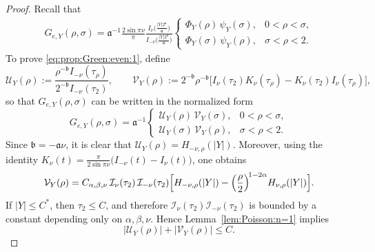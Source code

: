 \documentclass[12pt]{amsart}
\begin{document}
\begin{proof}
Recall that
\begin{align}\label{eq:normal}
G_{e,Y}(\rho,\sigma) = \mathfrak a^{-1} \frac{2\sin{\pi \nu}}{\pi} \frac{I_{\nu}\!\bigl( \frac{|Y| 2^{\mathfrak a}}{\mathfrak a} \bigr)}{I_{-\nu}\!\bigl( \frac{|Y| 2^{\mathfrak a}}{\mathfrak a} \bigr)}
\begin{cases}
\Phi_{Y}(\rho) \, \psi_{Y}(\sigma), &0<\rho<\sigma,\\[4pt]
\Phi_{Y}(\sigma) \, \psi_{Y}(\rho), &\sigma < \rho < 2.
\end{cases}
\end{align}
To prove \eqref{eq:prop:Green:even:1}, define
\begin{equation*}
    \mathcal{U}_Y(\rho):= \frac{\rho^{- \mathfrak b} I_{-\nu}(\tau_\rho)}{2^{-\mathfrak b} I_{-\nu}(\tau_2)},\qquad \mathcal{V}_Y(\rho):= 2^{-\mathfrak b} \rho^{-\mathfrak b} \bigl[ I_\nu(\tau_2) K_\nu(\tau_\rho) - K_\nu(\tau_2) I_\nu(\tau_\rho) \bigr],
\end{equation*}
so that $G_{e,Y}(\rho,\sigma)$ can be written in the normalized form
\begin{equation*}
G_{e,Y}(\rho,\sigma) = \mathfrak a^{-1}
\begin{cases}
\mathcal{U}_{Y}(\rho) \, \mathcal{V}_{Y}(\sigma), &0<\rho<\sigma,\\[4pt]
\mathcal{U}_{Y}(\sigma) \, \mathcal{V}_{Y}(\rho), &\sigma < \rho < 2.
\end{cases}
\end{equation*}
Since $\mathfrak b = - \mathfrak a \nu$, it is clear that $\mathcal{U}_Y(\rho) = H_{-\nu,\rho}(|Y|)$. Moreover, using the identity $K_\nu(t) = \frac{\pi}{2 \sin{\pi \nu}} \bigl( I_{-\nu}(t) - I_\nu(t) \bigr)$,
one obtains
\begin{equation*}
    \mathcal{V}_Y(\rho) = C_{\alpha,\beta,\nu} \, \mathcal{I}_\nu(\tau_2) \, \mathcal{I}_{-\nu}(\tau_2) \Bigl[ H_{-\nu,\rho}(|Y|) - \Bigl(\frac{\rho}{2}\Bigr)^{\!1-2\alpha} H_{\nu,\rho}(|Y|) \Bigr].
\end{equation*}
If $|Y|\le C^*$, then $\tau_2\le C$, and therefore $\mathcal{I}_\nu(\tau_2) \mathcal{I}_{-\nu}(\tau_2)$ is bounded by a constant depending only on $\alpha,\beta,\nu$. Hence Lemma~\ref{lem:Poisson:n=1} implies
\begin{equation*}
    |\mathcal{U}_Y(\rho)|+|\mathcal{V}_Y(\rho)|\le C.

\end{equation*}
\end{proof}
\end{document}
